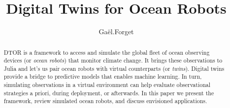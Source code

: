 \documentclass{juliacon}[12pt]
\begin{document}
\title{Digital Twins for Ocean Robots}

\author[1]{Gaël.Forget}



\maketitle

\begin{abstract}

DTOR is a framework to access and simulate the global fleet of ocean observing devices (or {\it ocean robots}) that monitor climate change. It brings these observations to Julia and let's us pair ocean robots with virtual counterparts (or {\it twins}). Digital twins provide a bridge to predictive models that enables machine learning. In turn, simulating observations in a virtual environment can help evaluate observational strategies a priori, during deployment, or afterwards. In this paper we present the framework, review simulated ocean robots, and discuss envisioned applications. 


\end{abstract}
\end{document}
